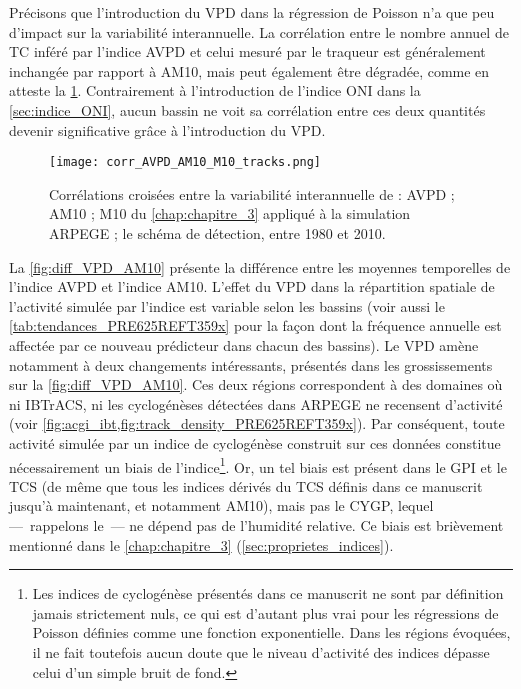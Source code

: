 \documentclass[../main.tex]{subfiles}
\begin{document}
Précisons que l'introduction du VPD dans la régression de Poisson n'a que peu d'impact sur la variabilité interannuelle. La corrélation entre le
nombre annuel de TC inféré par l'indice AVPD et celui mesuré par le traqueur est généralement inchangée par rapport à AM10, mais peut également être dégradée,
comme en atteste la \cref{fig:corr_AVPD_AM10_M10}. Contrairement à l'introduction de l'indice ONI dans la \cref{sec:indice_ONI}, aucun bassin ne voit sa
corrélation entre ces deux quantités devenir significative grâce à l'introduction du VPD.


\begin{figure}[htb]
    \centering
    \texttt{[image: corr\_AVPD\_AM10\_M10\_tracks.png]}
    \caption{Corrélations croisées entre la variabilité interannuelle de : AVPD ; AM10 ; M10 du \cref{chap:chapitre_3} appliqué à la simulation ARPEGE ; le
    schéma de détection, entre 1980 et 2010.}
    \label{fig:corr_AVPD_AM10_M10}
\end{figure}

La \cref{fig:diff_VPD_AM10} présente la différence entre les moyennes temporelles de l'indice AVPD et l'indice AM10. L'effet du VPD dans la répartition spatiale
de l'activité simulée par l'indice est variable selon les bassins (voir aussi le \cref{tab:tendances_PRE625REFT359x} pour la façon dont la fréquence annuelle
est affectée par ce nouveau prédicteur dans chacun des bassins). Le VPD amène notamment à deux changements intéressants, présentés dans les grossissements sur
la \cref{fig:diff_VPD_AM10}. Ces deux régions correspondent à des domaines où ni IBTrACS, ni les cyclogénèses détectées dans ARPEGE ne recensent d'activité
(voir \cref{fig:acgi_ibt,fig:track_density_PRE625REFT359x}). Par conséquent, toute activité simulée par un indice de cyclogénèse construit sur ces données
constitue nécessairement un biais de l'indice\footnote{Les indices de cyclogénèse présentés dans ce manuscrit ne sont par définition jamais strictement nuls, ce
qui est d'autant plus vrai pour les régressions de Poisson définies comme une fonction exponentielle. Dans les régions évoquées, il ne fait toutefois aucun
doute que le niveau d'activité des indices dépasse celui d'un simple bruit de fond.}. Or, un tel biais est présent dans le GPI et le TCS (de même que tous les
indices dérivés du TCS définis dans ce manuscrit jusqu'à maintenant, et notamment AM10), mais pas le CYGP, lequel ---~rappelons le~--- ne dépend pas de
l'humidité relative. Ce biais est brièvement mentionné dans le \cref{chap:chapitre_3} (\cref{sec:proprietes_indices}).
\end{document}
